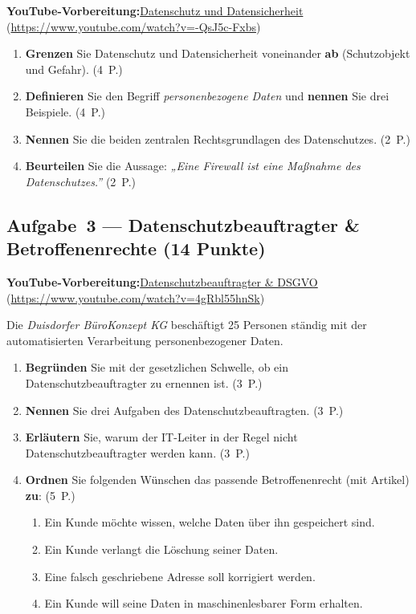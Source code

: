 \documentclass[11pt, a4paper]{article}
\begin{document}
\noindent\textbf{\color{bfwAccent}YouTube-Vorbereitung:}\enspace \href{https://www.youtube.com/watch?v=-QsJ5c-Fxbs}{Datenschutz und Datensicherheit} (\url{https://www.youtube.com/watch?v=-QsJ5c-Fxbs})

\medskip
\begin{enumerate}[label=(\alph*)]
  \item \textbf{Grenzen} Sie Datenschutz und Datensicherheit voneinander \textbf{ab} (Schutzobjekt und Gefahr). \hfill (4~P.)
  \item \textbf{Definieren} Sie den Begriff \emph{personenbezogene Daten} und \textbf{nennen} Sie drei Beispiele. \hfill (4~P.)
  \item \textbf{Nennen} Sie die beiden zentralen Rechtsgrundlagen des Datenschutzes. \hfill (2~P.)
  \item \textbf{Beurteilen} Sie die Aussage: \emph{„Eine Firewall ist eine Maßnahme des Datenschutzes.”} \hfill (2~P.)
\end{enumerate}

\subsection*{Aufgabe~3 --- Datenschutzbeauftragter \& Betroffenenrechte (14 Punkte)}

\noindent\textbf{\color{bfwAccent}YouTube-Vorbereitung:}\enspace \href{https://www.youtube.com/watch?v=4gRbl55hnSk}{Datenschutzbeauftragter \& DSGVO} (\url{https://www.youtube.com/watch?v=4gRbl55hnSk})

\medskip
Die \emph{Duisdorfer BüroKonzept KG} beschäftigt 25 Personen ständig mit der
automatisierten Verarbeitung personenbezogener Daten.

\begin{enumerate}[label=(\alph*)]
  \item \textbf{Begründen} Sie mit der gesetzlichen Schwelle, ob ein Datenschutzbeauftragter zu ernennen ist. \hfill (3~P.)
  \item \textbf{Nennen} Sie drei Aufgaben des Datenschutzbeauftragten. \hfill (3~P.)
  \item \textbf{Erläutern} Sie, warum der IT-Leiter in der Regel nicht Datenschutzbeauftragter werden kann. \hfill (3~P.)
  \item \textbf{Ordnen} Sie folgenden Wünschen das passende Betroffenenrecht (mit Artikel) \textbf{zu}: \hfill (5~P.)
    \begin{enumerate}[label=\arabic*., leftmargin=*]
      \item Ein Kunde möchte wissen, welche Daten über ihn gespeichert sind.
      \item Ein Kunde verlangt die Löschung seiner Daten.
      \item Eine falsch geschriebene Adresse soll korrigiert werden.
      \item Ein Kunde will seine Daten in maschinenlesbarer Form erhalten.
    \end{enumerate}
\end{enumerate}
\end{document}
